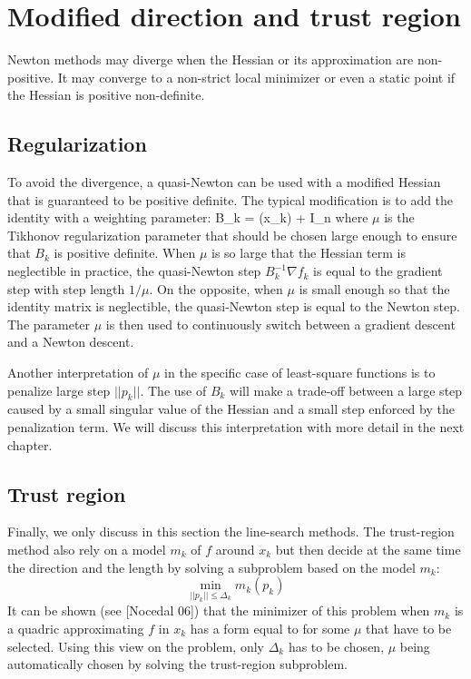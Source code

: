 \documentclass{book}
\begin{document}
\section{Modified direction and trust region}

Newton methods may diverge when the Hessian or its approximation are non-positive. It may converge to a non-strict local minimizer or even a static point if the Hessian is positive non-definite.

\subsection{Regularization}
To avoid the divergence, a quasi-Newton can be used with a modified Hessian that is guaranteed to be positive definite. The typical modification is to add the identity with a weighting parameter:
 B_k = (x_k) + \mu I_n \EOUT
where $\mu$ is the Tikhonov regularization parameter that should be chosen large enough to ensure that $B_k$ is positive definite. When $\mu$ is so large that the Hessian term is neglectible in practice, the quasi-Newton step $B_k^{-1} \nabla f_k$ is equal to the gradient step with step length $1/\mu$. On the opposite, when $\mu$ is small enough so that the identity matrix is neglectible, the quasi-Newton step is equal to the Newton step. The parameter $\mu$ is then used to continuously switch between a gradient descent and a Newton descent.

Another interpretation of $\mu$ in the specific case of least-square functions is to penalize large step $||p_k||$. The use of $B_k$ will make a trade-off between a large step caused by a small singular value of the Hessian and a small step enforced by the penalization term. We will discuss this interpretation with more detail in the next chapter. 

\subsection{Trust region}
Finally, we only discuss in this section the line-search methods. The trust-region method also rely on a model $m_k$ of $f$ around $x_k$ but then decide at the same time the direction and the length by solving a subproblem based on the model $m_k$:
\[ \min_{||p_k|| \le \Delta_k} m_k(p_k) \]
It can be shown (see [Nocedal 06]) that the minimizer of this problem when $m_k$ is a quadric approximating $f$ in $x_k$ has a form equal to  for some $\mu$ that have to be selected. Using this view on the problem, only $\Delta_k$ has to be chosen, $\mu$ being automatically chosen by solving the trust-region subproblem.
\end{document}
